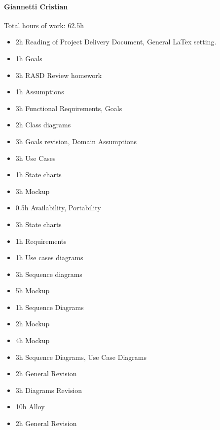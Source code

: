 \documentclass{report}
\begin{document}
		\paragraph{Giannetti Cristian} Total hours of work: 62.5h
			\begin{itemize}
				\item 2h Reading of Project Delivery Document, General LaTex setting.
				\item 1h Goals
				\item 3h RASD Review homework
				\item 1h Assumptions
				\item 3h Functional Requirements, Goals 
				\item 2h Class diagrams
				\item 3h Goals revision, Domain Assumptions
				\item 3h Use Cases
				\item 1h State charts
				\item 3h Mockup
				\item 0.5h Availability, Portability
				\item 3h State charts
				\item 1h Requirements
				\item 1h Use cases diagrams
				\item 3h Sequence diagrams
				\item 5h Mockup
				\item 1h Sequence Diagrams
				\item 2h Mockup
				\item 4h Mockup
				\item 3h Sequence Diagrams, Use Case Diagrams
				\item 2h General Revision
				\item 3h Diagrams Revision
				\item 10h Alloy
				\item 2h General Revision

			\end{itemize}
\end{document}
